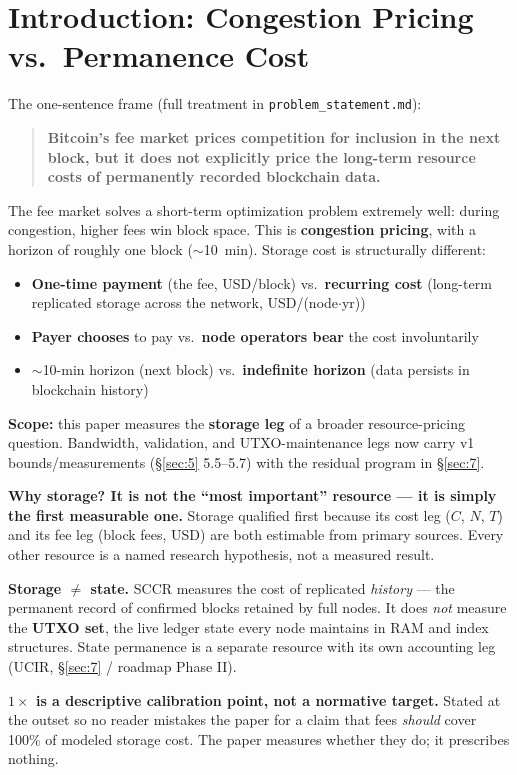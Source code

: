 \documentclass[11pt]{article}
\begin{document}
\section{Introduction: Congestion Pricing vs.\ Permanence Cost}\label{sec:1}
The one-sentence frame (full treatment in \texttt{problem\_statement.md}):
\begin{quote}
\textbf{Bitcoin's fee market prices competition for inclusion in the next block, but it does not explicitly price the long-term resource costs of permanently recorded blockchain data.}
\end{quote}
The fee market solves a short-term optimization problem extremely well: during congestion, higher fees win block space. This is \textbf{congestion pricing}, with a horizon of roughly one block ($\sim$10~min). Storage cost is structurally different:
\begin{itemize}[nosep]
  \item \textbf{One-time payment} (the fee, USD/block) vs.\ \textbf{recurring cost} (long-term replicated storage across the network, USD/(node$\cdot$yr))
  \item \textbf{Payer chooses} to pay vs.\ \textbf{node operators bear} the cost involuntarily
  \item $\sim$10-min horizon (next block) vs.\ \textbf{indefinite horizon} (data persists in blockchain history)
\end{itemize}
\textbf{Scope:} this paper measures the \textbf{storage leg} of a broader resource-pricing question. Bandwidth, validation, and UTXO-maintenance legs now carry v1 bounds/measurements (\S\ref{sec:5} 5.5--5.7) with the residual program in \S\ref{sec:7}.

\textbf{Why storage? It is not the ``most important'' resource --- it is simply the first measurable one.} Storage qualified first because its cost leg ($C$, $N$, $T$) and its fee leg (block fees, USD) are both estimable from primary sources. Every other resource is a named research hypothesis, not a measured result.

\textbf{Storage $\neq$ state.} SCCR measures the cost of replicated \emph{history} --- the permanent record of confirmed blocks retained by full nodes. It does \emph{not} measure the \textbf{UTXO set}, the live ledger state every node maintains in RAM and index structures. State permanence is a separate resource with its own accounting leg (UCIR, \S\ref{sec:7} / roadmap Phase II).

\textbf{$1\times$ is a descriptive calibration point, not a normative target.} Stated at the outset so no reader mistakes the paper for a claim that fees \emph{should} cover 100\% of modeled storage cost. The paper measures whether they do; it prescribes nothing.
\end{document}

